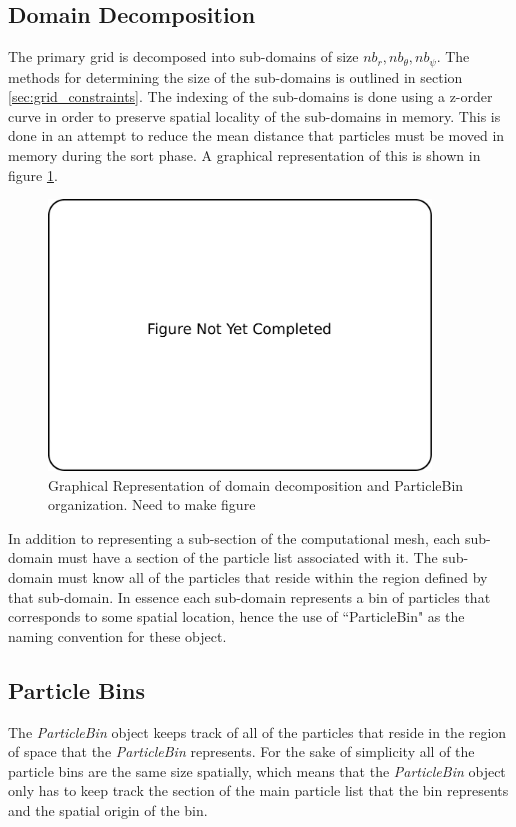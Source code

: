 	\subsection{Domain Decomposition}
		The primary grid is decomposed into sub-domains of size $nb_r, nb_{\theta}, nb_{\psi}$. The methods for determining the size of the sub-domains is outlined in section \ref{sec:grid_constraints}. The indexing of the sub-domains is done using a z-order curve in order to preserve spatial locality of the sub-domains in memory. This is done in an attempt to reduce the mean distance that particles must be moved in memory during the sort phase. A graphical representation of this is shown in figure \ref{fig:domain_decomp}.

\begin{figure}
\begin{center}
\includegraphics[width=4in]{introduction/not_finished.pdf}
\end{center}
\caption{Graphical Representation of domain decomposition and ParticleBin organization. Need to make figure}
\label{fig:domain_decomp}
\end{figure}

In addition to representing a sub-section of the computational mesh, each sub-domain must have a section of the particle list associated with it. The sub-domain must know all of the particles that reside within the region defined by that sub-domain. In essence each sub-domain represents a bin of particles that corresponds to some spatial location, hence the use of ``ParticleBin"  as the naming convention for these object.



	\subsection{Particle Bins}
The \emph{ParticleBin} object keeps track of all of the particles that reside in the region of space that the \emph{ParticleBin} represents. For the sake of simplicity all of the particle bins are the same size spatially, which means that the \emph{ParticleBin} object only has to keep track the section of the main particle list that the bin represents and the spatial origin of the bin. 


